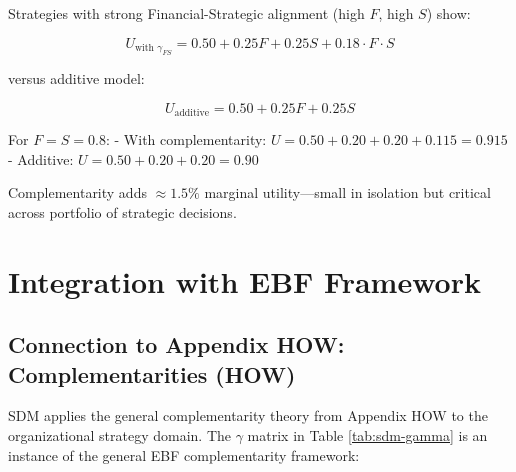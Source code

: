 Strategies with strong Financial-Strategic alignment (high $F$, high $S$) show:

\begin{equation}
U_{\text{with } \gamma_{FS}} = 0.50 + 0.25F + 0.25S + 0.18 \cdot F \cdot S
\end{equation}

versus additive model:

\begin{equation}
U_{\text{additive}} = 0.50 + 0.25F + 0.25S
\end{equation}

For $F = S = 0.8$:
- With complementarity: $U = 0.50 + 0.20 + 0.20 + 0.115 = 0.915$
- Additive: $U = 0.50 + 0.20 + 0.20 = 0.90$

Complementarity adds $\approx 1.5\%$ marginal utility---small in isolation but critical across portfolio of strategic decisions.

\section{Integration with EBF Framework}
\label{sec:sdm-integration}

\subsection{Connection to Appendix HOW: Complementarities (HOW)}

SDM applies the general complementarity theory from Appendix HOW to the organizational strategy domain. The $\gamma$ matrix in Table \ref{tab:sdm-gamma} is an instance of the general EBF complementarity framework:

